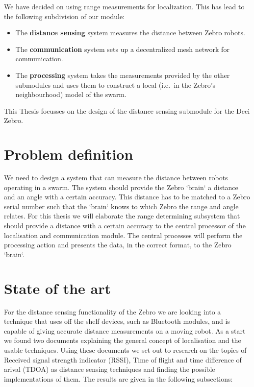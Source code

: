 We have decided on using range measurements for localization.
This has lead to the following subdivision of our module:
\begin{itemize}
  \item
    The \textbf{distance sensing} system measures the distance between Zebro robots.
  \item
    The \textbf{communication} system sets up a decentralized mesh network for communication.
  \item
    The \textbf{processing} system takes the measurements provided by the other submodules and uses them to construct a local (i.e.\ in the Zebro's neighbourhood) model of the swarm.
\end{itemize}

This Thesis focusses on the design of the distance sensing submodule for the Deci Zebro.

\section{Problem definition}

We need to design a system that can measure the distance between robots operating in a swarm.
The system should provide the Zebro `brain` a distance and an angle with a certain accuracy.
This distance has to be matched to a Zebro serial number such that the `brain` knows to which Zebro the range and angle relates.
For this thesis we will elaborate the range determining subsystem that should provide a distance with a certain accuracy to the central processor of the localisation and communication module.
The central processes will perform the processing action and presents the data, in the correct format, to the Zebro `brain`.

\section{State of the art}

For the distance sensing functionality of the Zebro we are looking into a technique that uses off the shelf devices, such as Bluetooth modules, and is capable of giving accurate distance measurements on a moving robot.
As a start we found two documents \cite{Ekberg2009,Kuriakose2014} explaining the general concept of localisation and the usable techniques.
Using these documents we set out to research on the topics of Received signal strength indicator (RSSI), Time of flight and time difference of arival (TDOA) as distance sensing techniques and finding the possible implementations of them.
The results are given in the following subsections:

